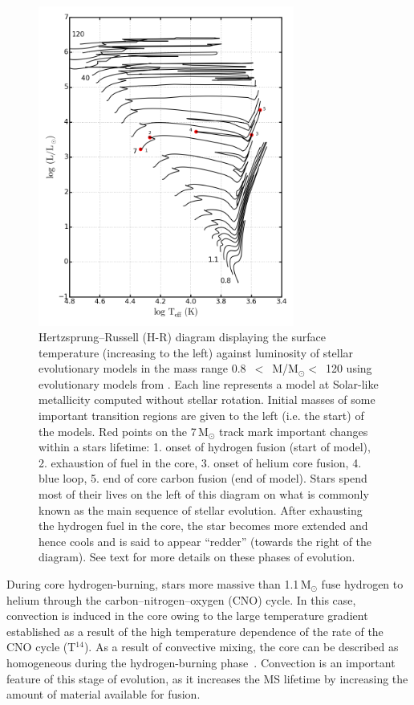 \begin{figure}
 \centering
 \includegraphics[width=0.75\textwidth]{intro/HRD-geneva}
 \caption[Hertzsprung--Russell (H-R) diagram of stars]{
Hertzsprung--Russell (H-R) diagram displaying the surface temperature (increasing to the left) against luminosity of stellar evolutionary models in the mass range
0.8~$<$~M/M$_{\odot}<$~120 using evolutionary models from
\protect\citet{2012A&A...537A.146E}.
Each line represents a model at Solar-like metallicity computed without stellar rotation.
Initial masses of some important transition regions are given to the left (i.e. the start) of the models.
Red points on the 7\,M$_{\odot}$ track mark important changes within a stars lifetime:
1. onset of hydrogen fusion (start of model),
2. exhaustion of fuel in the core,
3. onset of helium core fusion,
4. blue loop,
5. end of core carbon fusion (end of model).
Stars spend most of their lives on the left of this diagram on what is commonly known as the main sequence of stellar evolution.
After exhausting the hydrogen fuel in the core, the star becomes more extended and hence cools and is said to appear ``redder'' (towards the right of the diagram).
See text for more details on these phases of evolution.
 \label{fig:introHRD}}
\end{figure}


During core hydrogen-burning, stars more massive than 1.1\,M$_{\odot}$ fuse hydrogen to helium through the carbon--nitrogen--oxygen (CNO) cycle.
In this case, convection is induced in the core owing to the large temperature gradient established as a result of the high temperature dependence of the rate of the CNO cycle (T$^{14}$).
As a result of convective mixing, the core can be described as homogeneous during the hydrogen-burning phase~\citep{2012sse..book.....K}.
Convection is an important feature of this stage of evolution, as it increases the MS lifetime by increasing the amount of material available for fusion.

